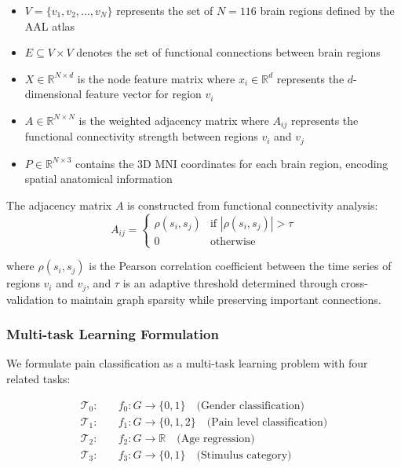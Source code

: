 \documentclass[10pt,journal,compsoc]{IEEEtran}
\begin{document}
\begin{itemize}
\item $V = \{v_1, v_2, ..., v_N\}$ represents the set of $N = 116$ brain regions defined by the AAL atlas \cite{tzourio2002automated}
\item $E \subseteq V \times V$ denotes the set of functional connections between brain regions
\item $X \in \mathbb{R}^{N \times d}$ is the node feature matrix where $x_i \in \mathbb{R}^d$ represents the $d$-dimensional feature vector for region $v_i$
\item $A \in \mathbb{R}^{N \times N}$ is the weighted adjacency matrix where $A_{ij}$ represents the functional connectivity strength between regions $v_i$ and $v_j$
\item $P \in \mathbb{R}^{N \times 3}$ contains the 3D MNI coordinates for each brain region, encoding spatial anatomical information
\end{itemize}

The adjacency matrix $A$ is constructed from functional connectivity analysis:
\begin{equation}
A_{ij} = \begin{cases} 
\rho(s_i, s_j) & \text{if } |\rho(s_i, s_j)| > \tau \\
0 & \text{otherwise}
\end{cases}
\end{equation}

where $\rho(s_i, s_j)$ is the Pearson correlation coefficient between the time series of regions $v_i$ and $v_j$, and $\tau$ is an adaptive threshold determined through cross-validation to maintain graph sparsity while preserving important connections.

\subsubsection{Multi-task Learning Formulation}

We formulate pain classification as a multi-task learning problem with four related tasks:

\begin{align}
\mathcal{T}_0: &\quad f_0: G \rightarrow \{0, 1\} \quad \text{(Gender classification)} \\
\mathcal{T}_1: &\quad f_1: G \rightarrow \{0, 1, 2\} \quad \text{(Pain level classification)} \\
\mathcal{T}_2: &\quad f_2: G \rightarrow \mathbb{R} \quad \text{(Age regression)} \\
\mathcal{T}_3: &\quad f_3: G \rightarrow \{0, 1\} \quad \text{(Stimulus category)}
\end{align}
\end{document}
